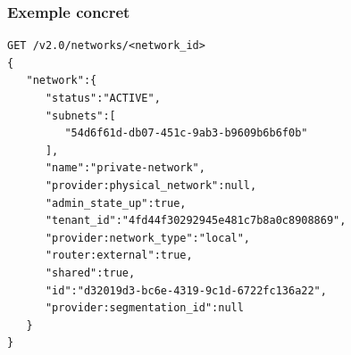  \begin{frame}[containsverbatim]
    \frametitle{Exemple concret}
\begin{verbatim}
GET /v2.0/networks/<network_id>
{
   "network":{
      "status":"ACTIVE",
      "subnets":[
         "54d6f61d-db07-451c-9ab3-b9609b6b6f0b"
      ],
      "name":"private-network",
      "provider:physical_network":null,
      "admin_state_up":true,
      "tenant_id":"4fd44f30292945e481c7b8a0c8908869",
      "provider:network_type":"local",
      "router:external":true,
      "shared":true,
      "id":"d32019d3-bc6e-4319-9c1d-6722fc136a22",
      "provider:segmentation_id":null
   }
}
\end{verbatim}
  \end{frame}

